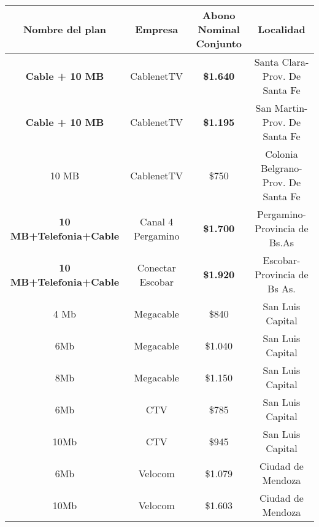 \begin{table}[H]
  \centering
  \tiny  
    \begin{tabular}{|c|c|c|r}
    \hline
    \textcolor[rgb]{ .122,  .286,  .49}{\textbf{Nombre del plan}} &
      \textcolor[rgb]{ .122,  .286,  .49}{\textbf{Empresa}} &
      \textcolor[rgb]{ .122,  .286,  .49}{\textbf{Abono Nominal Conjunto}} &
      \multicolumn{1}{c|}{\textcolor[rgb]{ .122,  .286,  .49}{\textbf{Localidad}}}
      \bigstrut\\
    \hline
    \textbf{Cable + 10 MB} &
      CablenetTV &
      \textbf{\$1.640} &
      \multicolumn{1}{c|}{Santa Clara-Prov. De Santa Fe}
      \bigstrut\\
    \hline
    \textbf{Cable + 10 MB} &
      CablenetTV &
      \textbf{\$1.195} &
      \multicolumn{1}{c|}{San Martin-Prov. De Santa Fe}
      \bigstrut\\
    \hline
    10 MB &
      CablenetTV &
      \$750 &
      \multicolumn{1}{c|}{Colonia Belgrano-Prov. De Santa Fe}
      \bigstrut\\
    \hline
    \textbf{10 MB+Telefonia+Cable} &
      Canal 4 Pergamino &
      \textbf{\$1.700} &
      \multicolumn{1}{c|}{Pergamino-Provincia de Bs.As}
      \bigstrut\\
    \hline
    \textbf{10 MB+Telefonia+Cable} &
      Conectar Escobar &
      \textbf{\$1.920} &
      \multicolumn{1}{c|}{Escobar-Provincia de Bs As.}
      \bigstrut\\
    \hline
    4 Mb &
      Megacable &
      \$840 &
      \multicolumn{1}{c|}{San Luis Capital}
      \bigstrut\\
    \hline
    6Mb &
      Megacable &
      \$1.040 &
      \multicolumn{1}{c|}{San Luis Capital}
      \bigstrut\\
    \hline
    8Mb &
      Megacable &
      \$1.150 &
      \multicolumn{1}{c|}{San Luis Capital}
      \bigstrut\\
    \hline
    6Mb &
      CTV &
      \$785 &
      \multicolumn{1}{c|}{San Luis Capital}
      \bigstrut\\
    \hline
    10Mb &
      CTV &
      \$945 &
      \multicolumn{1}{c|}{San Luis Capital}
      \bigstrut\\
    \hline
    6Mb &
      Velocom &
      \$1.079 &
      \multicolumn{1}{c|}{Ciudad de Mendoza}
      \bigstrut\\
    \hline
    10Mb &
      Velocom &
      \$1.603 &
      \multicolumn{1}{c|}{Ciudad de Mendoza}
      \bigstrut\\

\end{tabular}
\end{table}
